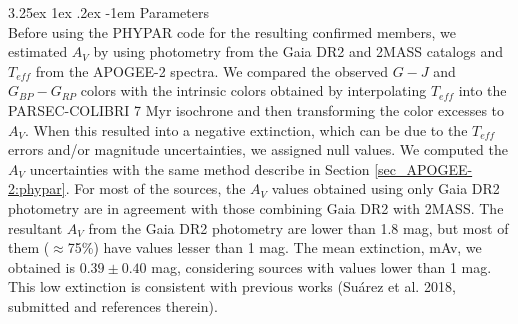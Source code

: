 \documentclass[12pt]{article}
\makeatletter
\renewcommand\paragraph{\@startsection{paragraph}{5}{\z@}%
  {3.25ex \@plus1ex \@minus.2ex}%
  {-1em}%
  {\normalfont\normalsize\bfseries}}
\makeatother
\begin{document}

\paragraph{Parameters\\}
\label{sec_APOGEE-2:parameters}
Before using the PHYPAR code for the resulting confirmed members, we estimated $A_V$ by using photometry from the Gaia DR2 and 2MASS catalogs and $T_{eff}$ from the APOGEE-2 spectra. We compared the observed $G-J$ and $G_{BP}-G_{RP}$ colors with the intrinsic colors obtained by interpolating $T_{eff}$ into the PARSEC-COLIBRI 7 Myr isochrone and then transforming the color excesses to $A_V$. When this resulted into a negative extinction, which can be due to the $T_{eff}$ errors and/or magnitude uncertainties, we assigned null values. We computed the $A_V$ uncertainties with the same method describe in Section \ref{sec_APOGEE-2:phypar}. For most of the sources, the $A_V$ values obtained using only Gaia DR2 photometry are in agreement with those combining Gaia DR2 with 2MASS. The resultant $A_V$ from the Gaia DR2 photometry are lower than 1.8 mag, but most of them ($\approx$75\%) have values lesser than 1 mag. The mean extinction, \ac{mAv}, we obtained is $0.39\pm0.40$ mag, considering sources with values lower than 1 mag. This low extinction is consistent with previous works (Su\'arez et al. 2018, submitted and references therein).
\end{document}
